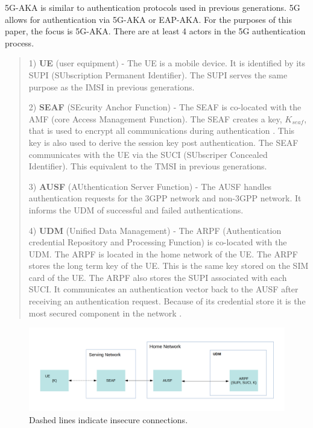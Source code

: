 \documentclass[11pt, pdftex]{article}
\begin{document}
5G-AKA is similar to authentication protocols used in previous generations.  5G allows for authentication via 5G-AKA or EAP-AKA.  For the purposes of this paper, the focus is 5G-AKA.  There are at least 4 actors in the 5G authentication process.  

\begin{quote}
1) \textbf{UE} (user equipment) -  The UE is a mobile device.  It is identified by its SUPI (SUbscription Permanent   
Identifier).  The SUPI serves the same purpose as the IMSI in previous generations.

2) \textbf{SEAF} (SEcurity Anchor Function) - The SEAF is co-located with the AMF (core Access Management Function).  The SEAF creates a key, $K_{seaf}$, that is used to encrypt all communications during authentication  \cite{zhang2017overview}.  This key is also used to derive the session key post authentication.  The SEAF communicates with the UE via the SUCI (SUbscriper Concealed Identifier).  This equivalent to the TMSI in previous generations. 

3) \textbf{AUSF} (AUthentication Server Function) -  The AUSF handles authentication requests for the 3GPP network and non-3GPP network.  It informs the UDM of successful and failed authentications.  

4) \textbf{UDM} (Unified Data Management) - The ARPF (Authentication credential Repository and Processing Function) is co-located with the UDM. The ARPF is located in the home network of the UE. The ARPF stores the long term key of the UE.  This is the same key stored on the SIM card of the UE.  The ARPF also stores the SUPI associated with each SUCI.  It communicates an authentication vector back to the AUSF after receiving an authentication request.  Because of its credential store it is the most secured component in the network \cite{cremers2017comprehensive}.

\end{quote}

\graphicspath{ {./images/} }
\begin{figure}[h]
	\begin{center}
		\includegraphics[scale=0.21]{Figure2_1.png}
	\end{center}
	\caption{Dashed lines indicate insecure connections.}
\end{figure}
\end{document}
